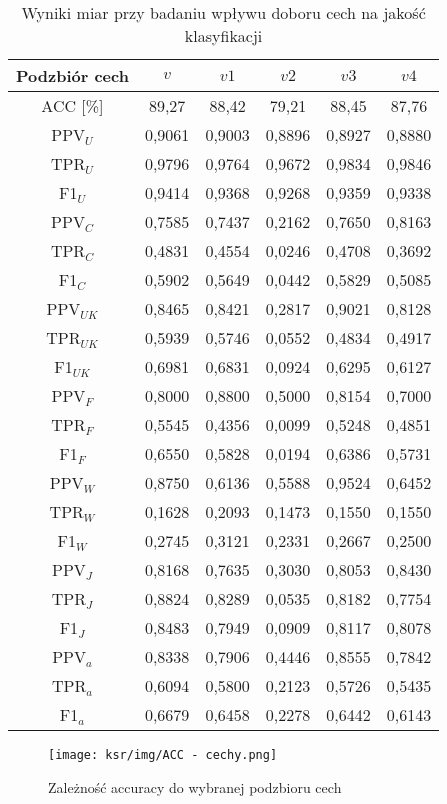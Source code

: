\documentclass{article}
\begin{document}
\begin{table}[H]
    \centering
    \begin{tabular}{|c|c|c|c|c|c|}
    \hline
    \textbf{Podzbiór cech} & \textbf{\(v\)} & \textbf{\(v1\)} & \textbf{\(v2\)} & \textbf{\(v3\)} & \textbf{\(v4\)}  \\ \hline
    ACC [\%] & 89,27 & 88,42 & 79,21 & 88,45 & 87,76\\ \hline
    PPV\(_U\) & 0,9061 &0,9003& 0,8896 & 0,8927 & 0,8880 \\ \hline
    TPR\(_U\) & 0,9796 &0,9764 & 0,9672 & 0,9834 & 0,9846\\ \hline
    F1\(_U\)  & 0,9414 &0,9368 & 0,9268 & 0,9359 & 0,9338\\ \hline
    PPV\(_C\) & 0,7585 &0,7437 & 0,2162 & 0,7650 & 0,8163\\ \hline
    TPR\(_C\) & 0,4831 &0,4554 & 0,0246 & 0,4708 & 0,3692\\ \hline
    F1\(_C\) & 0,5902 &0,5649 & 0,0442 & 0,5829 & 0,5085\\ \hline
    PPV\(_{UK}\) & 0,8465 &0,8421 & 0,2817 & 0,9021 & 0,8128\\ \hline
    TPR\(_{UK}\) & 0,5939 &0,5746 & 0,0552 & 0,4834 & 0,4917\\ \hline
    F1\(_{UK}\) & 0,6981 &0,6831 & 0,0924 & 0,6295 & 0,6127\\ \hline
    PPV\(_F\) & 0,8000 &0,8800 & 0,5000 & 0,8154 & 0,7000\\ \hline
    TPR\(_F\) & 0,5545 &0,4356 & 0,0099 & 0,5248 & 0,4851\\ \hline
    F1\(_F\) & 0,6550 &0,5828 & 0,0194 & 0,6386 & 0,5731\\ \hline
    PPV\(_W\) & 0,8750 &0,6136 & 0,5588 & 0,9524 & 0,6452\\ \hline
    TPR\(_W\) & 0,1628 &0,2093 & 0,1473 & 0,1550 & 0,1550\\ \hline
    F1\(_W\) & 0,2745 &0,3121 & 0,2331 & 0,2667 & 0,2500\\ \hline
    PPV\(_J\) &  0,8168 &0,7635 & 0,3030 & 0,8053 & 0,8430\\ \hline
    TPR\(_J\) & 0,8824 &0,8289 & 0,0535 & 0,8182 & 0,7754\\ \hline
    F1\(_J\) & 0,8483 & 0,7949 & 0,0909 & 0,8117 & 0,8078\\ \hline
    PPV\(_a\) & 0,8338 & 0,7906 & 0,4446 & 0,8555 & 0,7842 \\ \hline
    TPR\(_a\) &  0,6094 & 0,5800 & 0,2123 & 0,5726 & 0,5435\\ \hline
    F1\(_a\) & 0,6679 & 0,6458 & 0,2278 & 0,6442 & 0,6143\\ \hline
    \end{tabular}
    \caption{Wyniki miar przy badaniu wpływu doboru cech na jakość klasyfikacji}
\end{table}
\begin{figure}[H]
    \centering
    \texttt{[image: ksr/img/ACC - cechy.png]}
    \caption{Zależność accuracy do wybranej podzbioru cech}
    \label{fig:moj-obraz}
\end{figure}
\end{document}
